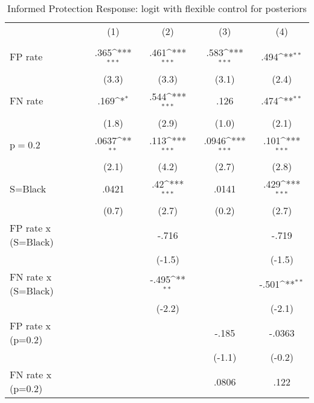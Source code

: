 \begin{table}[htbp]\centering
\def\sym#1{\ifmmode^{#1}\else\(^{#1}\)\fi}
\caption{Informed Protection Response: logit with flexible control for posteriors}
\begin{tabular}{l*{4}{c}}
\hline\hline
                &\multicolumn{1}{c}{(1)}&\multicolumn{1}{c}{(2)}&\multicolumn{1}{c}{(3)}&\multicolumn{1}{c}{(4)}\\
                &\multicolumn{1}{c}{}&\multicolumn{1}{c}{}&\multicolumn{1}{c}{}&\multicolumn{1}{c}{}\\
\hline
FP rate         &     .365\sym{***}&     .461\sym{***}&     .583\sym{***}&     .494\sym{**} \\
                &    (3.3)         &    (3.3)         &    (3.1)         &    (2.4)         \\
FN rate         &     .169\sym{*}  &     .544\sym{***}&     .126         &     .474\sym{**} \\
                &    (1.8)         &    (2.9)         &    (1.0)         &    (2.1)         \\
p$=$0.2         &    .0637\sym{**} &     .113\sym{***}&    .0946\sym{***}&     .101\sym{***}\\
                &    (2.1)         &    (4.2)         &    (2.7)         &    (2.8)         \\
S=Black         &    .0421         &      .42\sym{***}&    .0141         &     .429\sym{***}\\
                &    (0.7)         &    (2.7)         &    (0.2)         &    (2.7)         \\
FP rate x (S=Black)&                  &    -.716         &                  &    -.719         \\
                &                  &   (-1.5)         &                  &   (-1.5)         \\
FN rate x (S=Black)&                  &    -.495\sym{**} &                  &    -.501\sym{**} \\
                &                  &   (-2.2)         &                  &   (-2.1)         \\
FP rate x (p=0.2)&                  &                  &    -.185         &   -.0363         \\
                &                  &                  &   (-1.1)         &   (-0.2)         \\
FN rate x (p=0.2)&                  &                  &    .0806         &     .122         \\

\end{tabular}
\end{table}
